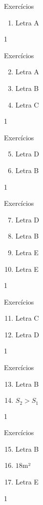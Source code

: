 \begin{answer}{Exercícios}
{\exerciselist
  \begin{enumerate}
  \item Letra A
  \end{enumerate}
}{1}
\end{answer}
\clearmargin
\begin{answer}{Exercícios}
{\exerciselist
  \begin{enumerate}\setcounter{enumi}{1}
  \item Letra A
  \item Letra B
  \item Letra C
  \end{enumerate}
}{1}
\end{answer}
\clearmargin
\begin{answer}{Exercícios}
{\exerciselist
  \begin{enumerate}\setcounter{enumi}{4}
  \item Letra D
  \item Letra B
  \end{enumerate}
}{1}
\end{answer}
\clearmargin
\begin{answer}{Exercícios}
{\exerciselist
  \begin{enumerate}\setcounter{enumi}{6}
  \item Letra D
  \item Letra B
  \item Letra E
  \item Letra E
  \end{enumerate}
}{1}
\end{answer}
\clearmargin
\begin{answer}{Exercícios}
{\exerciselist
  \begin{enumerate}\setcounter{enumi}{10}
  \item Letra C
  \item Letra D
  \end{enumerate}
}{1}
\end{answer}
\clearmargin
\begin{answer}{Exercícios}
{\exerciselist
  \begin{enumerate}\setcounter{enumi}{12}
  \item Letra B
  \item $S_2>S_1$
  \end{enumerate}
}{1}
\end{answer}
\clearmargin
\begin{answer}{Exercícios}
{\exerciselist
  \begin{enumerate}\setcounter{enumi}{14}
  \item Letra B
  \item $18$m²
  \item Letra E
  \end{enumerate}
}{1}
\end{answer}
